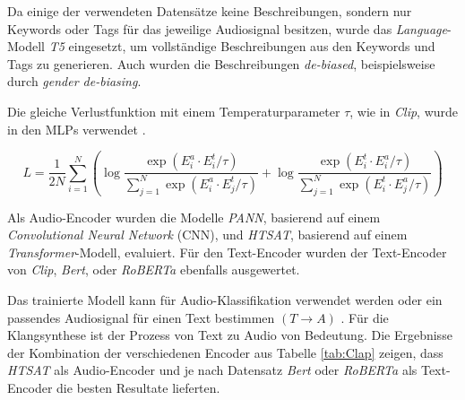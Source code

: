 \documentclass[
  a4paper,  %
  twoside,  %
  bibliography=totoc,
  headsepline,
  cleardoublepage=empty,
  parskip=half,
  draft=false
]{scrbook}
\begin{document}
Da einige der verwendeten Datensätze keine Beschreibungen, sondern nur Keywords oder Tags für das jeweilige Audiosignal besitzen, wurde das \emph{Language}-Modell \emph{T5}\cite{raffel_exploring_2020} eingesetzt, um vollständige Beschreibungen aus den Keywords und Tags zu generieren. Auch wurden die Beschreibungen \emph{de-biased}, beispielsweise durch \emph{gender de-biasing}. \cite{wu_large-scale_2023}

Die gleiche Verlustfunktion mit einem Temperaturparameter $\tau$, wie in \emph{Clip}\cite{radford_learning_2021}, wurde in den MLPs verwendet \cite{wu_large-scale_2023}.

\begin{equation}
L=\frac{1}{2 N} \sum_{i=1}^N\left(\log \frac{\exp \left(E_i^a \cdot E_i^t / \tau\right)}{\sum_{j=1}^N \exp \left(E_i^a \cdot E_j^t / \tau\right)}+\log \frac{\exp \left(E_i^t \cdot E_i^a / \tau\right)}{\sum_{j=1}^N \exp \left(E_i^t \cdot E_j^a / \tau\right)}\right)
\end{equation}

Als Audio-Encoder wurden die Modelle \emph{PANN}\cite{kong_panns_2020}, basierend auf einem \emph{Convolutional Neural Network} (CNN), und \emph{HTSAT}\cite{chen_hts-at_2022}, basierend auf einem \emph{Transformer}-Modell, evaluiert. Für den Text-Encoder wurden der Text-Encoder von \emph{Clip}\cite{radford_learning_2021}, \emph{Bert}\cite{devlin_bert_2019}, oder \emph{RoBERTa}\cite{liu_roberta_2019} ebenfalls ausgewertet. \cite{wu_large-scale_2023}

Das trainierte Modell kann für Audio-Klassifikation verwendet werden oder ein passendes Audiosignal für einen Text bestimmen $(T\rightarrow A)$ \cite{wu_large-scale_2023}. Für die Klangsynthese ist der Prozess von Text zu Audio von Bedeutung. Die Ergebnisse der Kombination der verschiedenen Encoder aus Tabelle \ref{tab:Clap} zeigen, dass \emph{HTSAT}\cite{chen_hts-at_2022} als Audio-Encoder und je nach Datensatz \emph{Bert}\cite{devlin_bert_2019} oder \emph{RoBERTa}\cite{liu_roberta_2019} als Text-Encoder die besten Resultate lieferten. \cite{wu_large-scale_2023}
\end{document}
